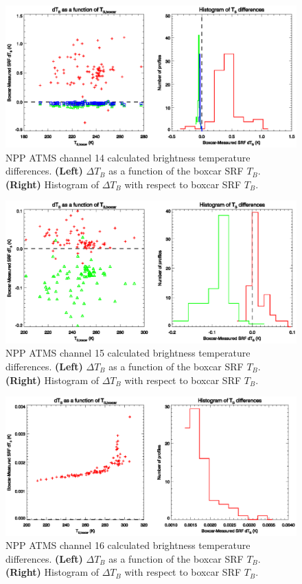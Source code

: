 \begin{figure}[H]
  \centering
  \includegraphics[scale=1]{graphics/dtb/atms_npp.ch14.TbStats.eps}
  \caption{NPP ATMS channel 14 calculated brightness temperature differences. \textbf{(Left)} $\Delta T_B$ as a function of the boxcar SRF $T_B$. \textbf{(Right)} Histogram of $\Delta T_B$ with respect to boxcar SRF $T_B$.}
  \label{fig:atms_npp.ch14.dtb}
\end{figure}

\begin{figure}[H]
  \centering
  \includegraphics[scale=1]{graphics/dtb/atms_npp.ch15.TbStats.eps}
  \caption{NPP ATMS channel 15 calculated brightness temperature differences. \textbf{(Left)} $\Delta T_B$ as a function of the boxcar SRF $T_B$. \textbf{(Right)} Histogram of $\Delta T_B$ with respect to boxcar SRF $T_B$.}
  \label{fig:atms_npp.ch15.dtb}
\end{figure}

\begin{figure}[H]
  \centering
  \includegraphics[scale=1]{graphics/dtb/atms_npp.ch16.TbStats.eps}
  \caption{NPP ATMS channel 16 calculated brightness temperature differences. \textbf{(Left)} $\Delta T_B$ as a function of the boxcar SRF $T_B$. \textbf{(Right)} Histogram of $\Delta T_B$ with respect to boxcar SRF $T_B$.}
  \label{fig:atms_npp.ch16.dtb}
\end{figure}

